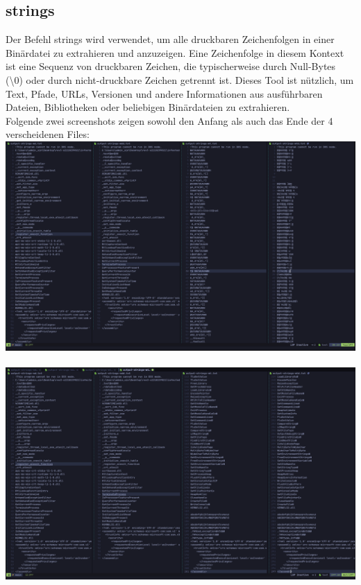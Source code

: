 \documentclass{article}
\begin{document}
	\pagebreak
	
	\subsection*{strings}
	Der Befehl strings wird verwendet, um alle druckbaren Zeichenfolgen in einer Binärdatei zu extrahieren und anzuzeigen. Eine Zeichenfolge in diesem Kontext ist eine Sequenz von druckbaren Zeichen, die typischerweise durch Null-Bytes (\textbackslash0) oder durch nicht-druckbare Zeichen getrennt ist. Dieses Tool ist nützlich, um Text, Pfade, URLs, Versionen und andere Informationen aus ausführbaren Dateien, Bibliotheken oder beliebigen Binärdateien zu extrahieren.\\
	Folgende zwei screenshots zeigen sowohl den Anfang als auch das Ende der 4 verscheidenen Files:\\
	\includegraphics[width=1\linewidth]{pictures/1. strings from all files}\\
	\\
	\includegraphics[width=1\linewidth]{pictures/1. strings from all files.2}\\
	
\end{document}

